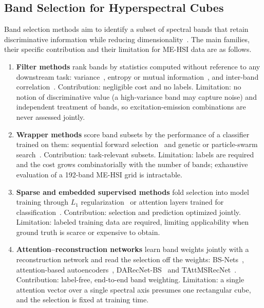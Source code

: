 \subsection{Band Selection for Hyperspectral Cubes}
\label{sec:related_band}

Band selection methods aim to identify a subset of spectral bands that retain discriminative information while reducing dimensionality~\cite{sun2019hyperspectral,sawant2021survey}.
The main families, their specific contribution and their limitation for ME-HSI data are as follows.
\begin{enumerate}
\item \textbf{Filter methods} rank bands by statistics computed without reference to any downstream task: variance~\cite{chang2000constrained}, entropy or mutual information~\cite{guo2006band}, and inter-band correlation~\cite{martinez2006comparison}.
  Contribution: negligible cost and no labels.
  Limitation: no notion of discriminative value (a high-variance band may capture noise) and independent treatment of bands, so excitation-emission combinations are never assessed jointly.
\item \textbf{Wrapper methods} score band subsets by the performance of a classifier trained on them: sequential forward selection~\cite{pudil1994floating} and genetic or particle-swarm search~\cite{pal2010feature}.
  Contribution: task-relevant subsets.
  Limitation: labels are required and the cost grows combinatorially with the number of bands; exhaustive evaluation of a 192-band ME-HSI grid is intractable.
\item \textbf{Sparse and embedded supervised methods} fold selection into model training through $L_1$ regularization~\cite{tibshirani1996regression} or attention layers trained for classification~\cite{lorenzo2020attention}.
  Contribution: selection and prediction optimized jointly.
  Limitation: labeled training data are required, limiting applicability when ground truth is scarce or expensive to obtain.
\item \textbf{Attention--reconstruction networks} learn band weights jointly with a reconstruction network and read the selection off the weights: BS-Nets~\cite{cai2020bsnets}, attention-based autoencoders~\cite{dou2021attentionae}, DARecNet-BS~\cite{roy2021darecnet} and TAttMSRecNet~\cite{nandi2023tattmsrecnet}.
  Contribution: label-free, end-to-end band weighting.
  Limitation: a single attention vector over a single spectral axis presumes one rectangular cube, and the selection is fixed at training time.

\end{enumerate}
